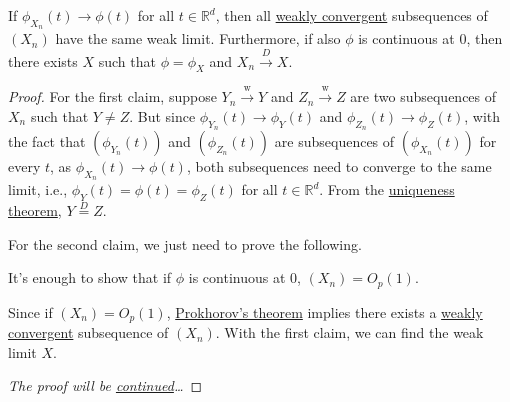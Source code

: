 \begin{theorem}\label{thm:Levy-Cramer-continuity}
	If \(\phi _{X_n}(t) \to \phi (t)\) for all \(t \in \mathbb{R} ^d\), then all \hyperref[def:converge-weakly]{weakly convergent} subsequences of \((X_n)\) have the same weak limit. Furthermore, if also \(\phi \) is continuous at \(0\), then there exists \(X\) such that \(\phi = \phi _X\)  and \(X_n \overset{D}{\to } X\).
\end{theorem}
\begin{proof}\let\qed\relax
	For the first claim, suppose \(Y_n \overset{\text{w} }{\to } Y\) and \(Z_n \overset{\text{w} }{\to } Z\) are two subsequences of \(X_n\) such that \(Y \neq Z\). But since \(\phi _{Y_n}(t) \to \phi _Y(t)\) and \(\phi _{Z_n}(t) \to \phi _Z(t)\), with the fact that \((\phi _{Y_n}(t))\) and \((\phi _{Z_n}(t))\) are subsequences of \((\phi _{X_n}(t))\) for every \(t\), as \(\phi _{X_n}(t) \to \phi (t)\), both subsequences need to converge to the same limit, i.e., \(\phi _Y(t) = \phi (t) = \phi _Z(t)\) for all \(t \in \mathbb{R} ^d\). From the \hyperref[thm:characteristic-function-uniqueness]{uniqueness theorem}, \(Y \overset{D}{=} Z\).

	For the second claim, we just need to prove the following.
	\begin{claim}
		It's enough to show that if \(\phi \) is continuous at \(0\), \((X_n) = O_p(1)\).
	\end{claim}
	\begin{explanation}
		Since if \((X_n) = O_p(1)\), \hyperref[thm:Prokhorov]{Prokhorov's theorem} implies there exists a \hyperref[def:converge-weakly]{weakly convergent} subsequence of \((X_n)\). With the first claim, we can find the weak limit \(X\).
	\end{explanation}
	\emph{The proof will be \hyperref[pf:thm:Levy-Cramer-continuity]{continued}\dots}
\end{proof}